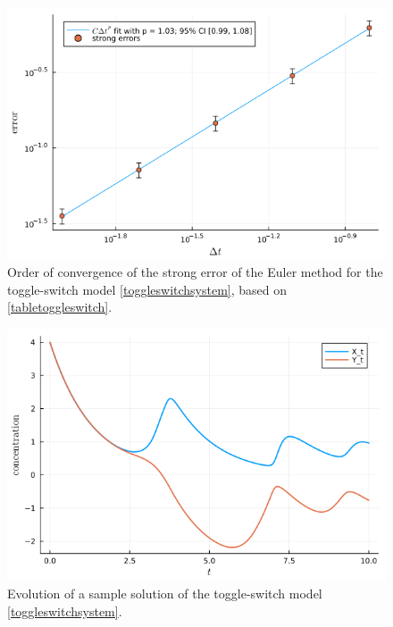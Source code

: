 \documentclass[reqno,12pt]{amsart}
\theoremstyle{plain} %
\theoremstyle{definition} %
\begin{document}
\begin{figure}[htb]
    \includegraphics[scale=0.6]{img/order_toggleswitch.png}
    \caption{Order of convergence of the strong error of the Euler method for the toggle-switch model \eqref{toggleswitchsystem}, based on \cref{tabletoggleswitch}.}
    \label{figtoggleswitch}
\end{figure}

\begin{figure}[htb]
    \includegraphics[scale=0.6]{img/evolution_toggleswitch.png}
    \caption{Evolution of a sample solution of the toggle-switch model \eqref{toggleswitchsystem}.}
    \label{figtoggleswitchevolution}
\end{figure}
\end{document}
